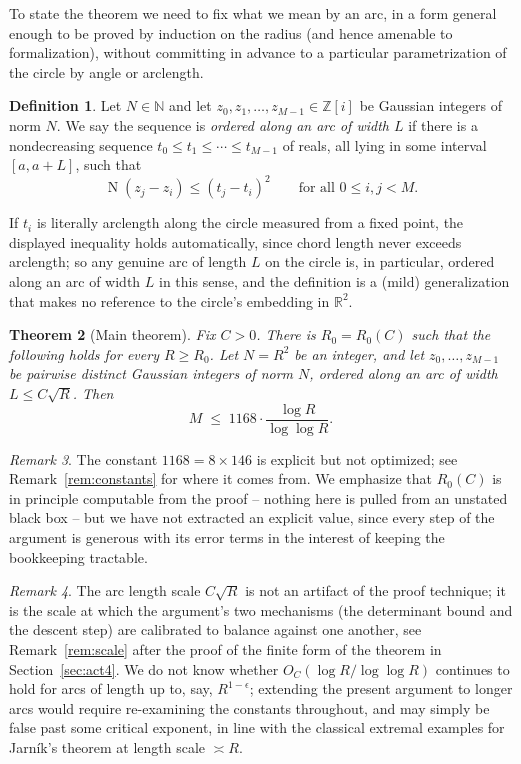 \documentclass[11pt]{amsart}
\newtheorem{theorem}{Theorem}[section]
\theoremstyle{definition}
\newtheorem{definition}[theorem]{Definition}
\theoremstyle{remark}
\newtheorem{remark}[theorem]{Remark}
\newcommand{\Z}{\mathbb{Z}}
\newcommand{\R}{\mathbb{R}}
\newcommand{\N}{\mathbb{N}}
\DeclareMathOperator{\Nm}{N}
\newcommand{\nm}[1]{\Nm(#1)}
\begin{document}
To state the theorem we need to fix what we mean by an arc, in a form general enough to be proved by induction on the radius (and hence amenable to formalization), without committing in advance to a particular parametrization of the circle by angle or arclength.

\begin{definition}
Let $N\in\N$ and let $z_0,z_1,\dots,z_{M-1}\in\Z[i]$ be Gaussian integers of norm $N$. We say the sequence is \emph{ordered along an arc of width $L$} if there is a nondecreasing sequence $t_0\le t_1\le \cdots \le t_{M-1}$ of reals, all lying in some interval $[a,a+L]$, such that
\[
\nm{z_j-z_i} \le (t_j-t_i)^2 \qquad \text{for all } 0\le i,j<M.
\]
\end{definition}

If $t_i$ is literally arclength along the circle measured from a fixed point, the displayed inequality holds automatically, since chord length never exceeds arclength; so any genuine arc of length $L$ on the circle is, in particular, ordered along an arc of width $L$ in this sense, and the definition is a (mild) generalization that makes no reference to the circle's embedding in $\R^2$.

\begin{theorem}[Main theorem]\label{thm:main}
Fix $C>0$. There is $R_0=R_0(C)$ such that the following holds for every $R \ge R_0$. Let $N=R^2$ be an integer, and let $z_0,\dots,z_{M-1}$ be \emph{pairwise distinct} Gaussian integers of norm $N$, ordered along an arc of width $L \le C\sqrt{R}$. Then
\[
M \;\le\; 1168\cdot \frac{\log R}{\log\log R}.
\]
\end{theorem}

\begin{remark}
The constant $1168 = 8\times 146$ is explicit but not optimized; see Remark~\ref{rem:constants} for where it comes from. We emphasize that $R_0(C)$ is in principle computable from the proof -- nothing here is pulled from an unstated black box -- but we have not extracted an explicit value, since every step of the argument is generous with its error terms in the interest of keeping the bookkeeping tractable.
\end{remark}

\begin{remark}
The arc length scale $C\sqrt{R}$ is not an artifact of the proof technique; it is the scale at which the argument's two mechanisms (the determinant bound and the descent step) are calibrated to balance against one another, see Remark~\ref{rem:scale} after the proof of the finite form of the theorem in Section~\ref{sec:act4}. We do not know whether $O_C(\log R/\log\log R)$ continues to hold for arcs of length up to, say, $R^{1-\epsilon}$; extending the present argument to longer arcs would require re-examining the constants throughout, and may simply be false past some critical exponent, in line with the classical extremal examples for Jarn\'{i}k's theorem at length scale $\asymp R$.
\end{remark}
\end{document}
